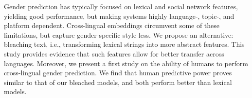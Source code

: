 Gender prediction has typically focused on lexical and social network features, yielding good performance, but making systems highly language-, topic-, and platform dependent. Cross-lingual embeddings circumvent some of these limitations, but capture gender-specific style less. We propose an alternative: bleaching text, i.e., transforming lexical strings into more abstract features. This study provides evidence that such features allow for better transfer across languages. Moreover, we present a first study on the ability of humans to perform cross-lingual gender prediction. We find that human predictive power proves similar to that of our bleached models, and both perform better than lexical models.
